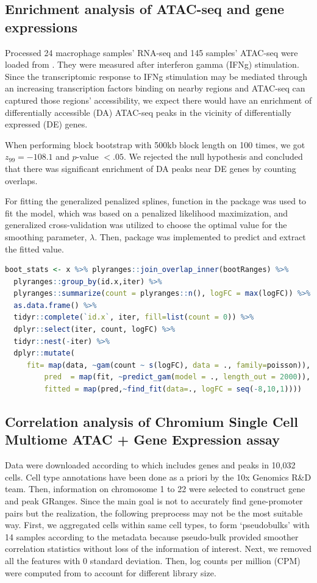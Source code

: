 \documentclass{article}
\begin{document}
\subsection{Enrichment analysis of ATAC-seq and gene expressions}\label{sec:splines}
Processed 24 macrophage samples' RNA-seq  and 145 samples' ATAC-seq were loaded from  \citep{lee2020fluent}. They were measured after interferon gamma (IFNg) stimulation. Since the transcriptomic response to IFNg stimulation may be mediated through an increasing transcription factors binding on nearby regions and ATAC-seq can captured those regions' accessibility, we expect there would have an enrichment of differentially accessible (DA) ATAC-seq peaks in the vicinity of differentially expressed (DE) genes. 

When performing block bootstrap with 500kb block length on 100 times, we got $z_{99}=-108.1$ and $\textit{p}$-value $<.05$. We rejected the null hypothesis and concluded that there was significant enrichment of DA peaks near DE genes by counting overlaps.

For fitting the generalized penalized splines,  function in the  package was used to fit the model, which was based on a penalized likelihood maximization, and generalized cross-validation was utilized to choose the optimal value for the smoothing parameter, $\lambda$. Then,  package was implemented to predict and extract the fitted value. 

\begin{lstlisting}[language=R]
boot_stats <- x %>% plyranges::join_overlap_inner(bootRanges) %>%
  plyranges::group_by(id.x,iter) %>%
  plyranges::summarize(count = plyranges::n(), logFC = max(logFC)) %>%
  as.data.frame() %>%
  tidyr::complete(`id.x`, iter, fill=list(count = 0)) %>%
  dplyr::select(iter, count, logFC) %>%
  tidyr::nest(-iter) %>%
  dplyr::mutate(
	 fit= map(data, ~gam(count ~ s(logFC), data = ., family=poisson)),
         pred  = map(fit, ~predict_gam(model = ., length_out = 2000)),
         fitted = map(pred,~find_fit(data=., logFC = seq(-8,10,1))))

\end{lstlisting} 

\subsection{Correlation analysis of Chromium Single Cell Multiome ATAC + Gene Expression assay}
Data were downloaded according to \citet{Vignette} which includes genes and peaks in 10,032 cells. 
Cell type annotations have been done as a priori by the 10x Genomics R\&D team. 
Then, information on chromosome 1 to 22 were selected to construct gene and peak GRanges. 
Since the main goal is not to accurately find gene-promoter pairs but the realization, the following preprocess may not be the most suitable way. 
First, we aggregated cells within same cell types, to form ‘pseudobulks’ with 14 samples according to the metadata because pseudo-bulk provided smoother correlation statistics without loss of the information of interest. 
Next, we removed all the features with 0 standard deviation. 
Then, log counts per million (CPM) were computed from  to account for different library size.
\end{document}
